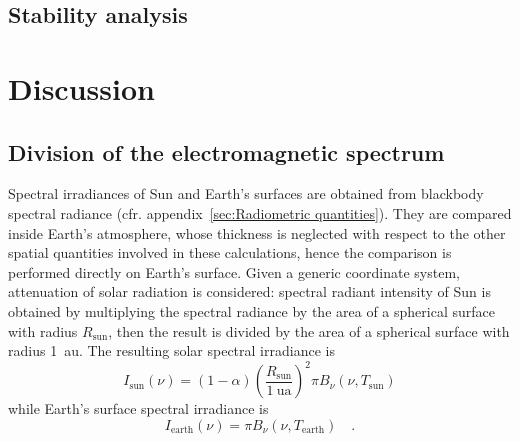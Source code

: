 \documentclass[a4paper,10pt,final,twocolumn]{article}
\begin{document}
\subsection{Stability analysis}



\section{Discussion}



\subsection{Division of the electromagnetic spectrum}
\label{sec:Division of the electromagnetic spectrum}
Spectral irradiances of Sun and Earth's surfaces are obtained from blackbody spectral radiance (cfr. appendix~\ref{sec:Radiometric quantities}). They are compared inside Earth's atmosphere, whose thickness is neglected with respect to the other spatial quantities involved in these calculations, hence the comparison is performed directly on Earth's surface. Given a generic coordinate system, attenuation of solar radiation is considered: spectral radiant intensity of Sun is obtained by multiplying the spectral radiance by the area of a spherical surface with radius $R_\text{sun}$, then the result is divided by the area of a spherical surface with radius \qty{1}{\astronomicalunit}. The resulting solar spectral irradiance is
\begin{equation}
  \label{eq:spectral_irradiance_sun}
  I_\text{sun}(\nu) = (1 - \alpha) \left( \frac{R_\text{sun}}{\qty{1}{\astronomicalunit}} \right)^2 \pi B_\nu(\nu, T_\text{sun})
\end{equation}
while Earth's surface spectral irradiance is
\begin{equation}
  \label{eq:spectral_irradiance_earth}
  I_\text{earth}(\nu) = \pi B_\nu(\nu, T_\text{earth})
  \quad .
\end{equation}
\end{document}
